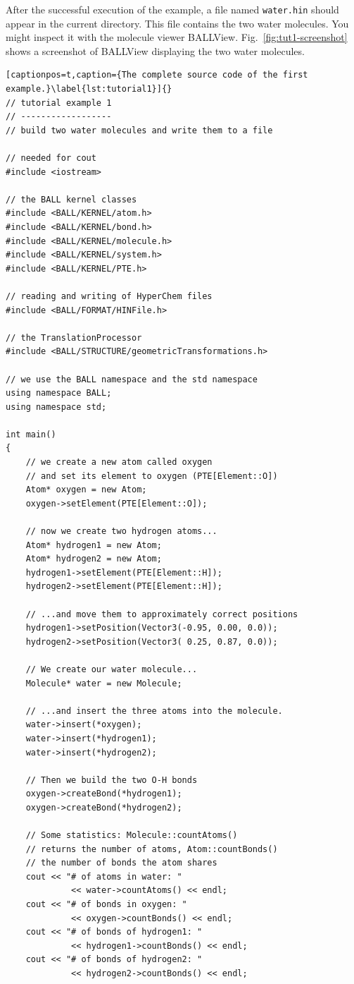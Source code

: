 After the successful execution of the example, a file named {\tt water.hin}
should appear in the current directory. This file contains the two water
molecules. You might inspect it with the molecule viewer BALLView.
Fig.~\ref{fig:tut1-screenshot} shows a screenshot of BALLView displaying the two
water molecules.

\newpage
\begin{lstlisting}[captionpos=t,caption={The complete source code of the first example.}\label{lst:tutorial1}]{}
// tutorial example 1
// ------------------
// build two water molecules and write them to a file

// needed for cout
#include <iostream>

// the BALL kernel classes
#include <BALL/KERNEL/atom.h>
#include <BALL/KERNEL/bond.h>
#include <BALL/KERNEL/molecule.h>
#include <BALL/KERNEL/system.h>
#include <BALL/KERNEL/PTE.h>

// reading and writing of HyperChem files
#include <BALL/FORMAT/HINFile.h>

// the TranslationProcessor
#include <BALL/STRUCTURE/geometricTransformations.h>

// we use the BALL namespace and the std namespace
using namespace BALL;
using namespace std;

int main()
{
	// we create a new atom called oxygen
	// and set its element to oxygen (PTE[Element::O])
	Atom* oxygen = new Atom;
	oxygen->setElement(PTE[Element::O]);

	// now we create two hydrogen atoms...
	Atom* hydrogen1 = new Atom;
	Atom* hydrogen2 = new Atom;
	hydrogen1->setElement(PTE[Element::H]);
	hydrogen2->setElement(PTE[Element::H]);

	// ...and move them to approximately correct positions
 	hydrogen1->setPosition(Vector3(-0.95, 0.00, 0.0));
 	hydrogen2->setPosition(Vector3( 0.25, 0.87, 0.0));

	// We create our water molecule...
	Molecule* water = new Molecule;

	// ...and insert the three atoms into the molecule.
	water->insert(*oxygen);
	water->insert(*hydrogen1);
	water->insert(*hydrogen2);

	// Then we build the two O-H bonds
	oxygen->createBond(*hydrogen1);
	oxygen->createBond(*hydrogen2);

	// Some statistics: Molecule::countAtoms() 
	// returns the number of atoms, Atom::countBonds() 
	// the number of bonds the atom shares
	cout << "# of atoms in water: " 
			 << water->countAtoms() << endl;
	cout << "# of bonds in oxygen: " 
			 << oxygen->countBonds() << endl;
	cout << "# of bonds of hydrogen1: " 
			 << hydrogen1->countBonds() << endl;
	cout << "# of bonds of hydrogen2: " 
			 << hydrogen2->countBonds() << endl;


\end{lstlisting}
